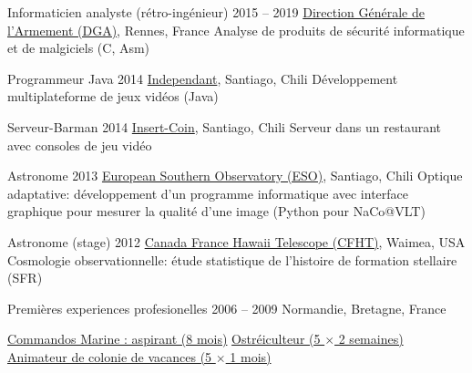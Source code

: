 \begin{joblist}[12.8][8.4][4]

\setlength{\parskip}{0.5cm}
\vspace{-0.4cm}

\item[Informaticien analyste (rétro-ingénieur)]{2015 -- 2019}
	{
  \href{http://www.defense.gouv.fr/dga/}{Direction Générale de l'Armement (DGA)}, Rennes, France
  }
  {Analyse de produits de sécurité informatique et de malgiciels (C, Asm)}

\item[Programmeur Java]{2014}
	{
	\href{https://tinmarino.github.io/Page/}{Independant}, Santiago, Chili
  }
  {Développement multiplateforme de jeux vidéos (Java)}


\item[Serveur-Barman]{2014}
	{
	\href{http://www.insertcoin.cl/}{Insert-Coin}, Santiago, Chili
  }
	{Serveur dans un restaurant avec consoles de jeu vidéo}


\item[Astronome]{2013}
	{
	\href{http://www.eso.org/public/}{European Southern Observatory (ESO)}, Santiago, Chili
	}
  {Optique adaptative: développement d'un programme informatique avec interface graphique pour mesurer la qualité d'une image (Python pour NaCo@VLT)}


\item[Astronome (stage)]{2012}
	{
\href{http://www.eso.org/public/}{Canada France Hawaii Telescope (CFHT)}, Waimea, USA
  }
  {Cosmologie observationnelle: étude statistique de l'histoire de formation stellaire (SFR)}

\item[Premières experiences profesionelles]{2006 -- 2009}
	{
	Normandie, Bretagne, France
	}
	{
    \renewcommand\labelitemi{{\boldmath$\cdot$}}
		\vspace{-0.8cm}
    \setlength{\parskip}{0cm}
		\begin{itemize}
		\setlength\itemsep{0cm}
    \cvitem \href{http://www.defense.gouv.fr/marine/organisation/forces/fusiliers-marins-et-commandos/force-maritime-des-fusiliers-marins-et-commandos}{Commandos Marine : aspirant (8 mois)}
    \cvitem \href{http://huitresdesaintvaast.fr/}{Ostréiculteur (5 $\times$ 2 semaines)}
    \cvitem \href{http://www.vacances-pour-tous.org/}{Animateur de colonie de vacances (5 $\times$ 1 mois)}
		\end{itemize}
  }
\end{joblist}



